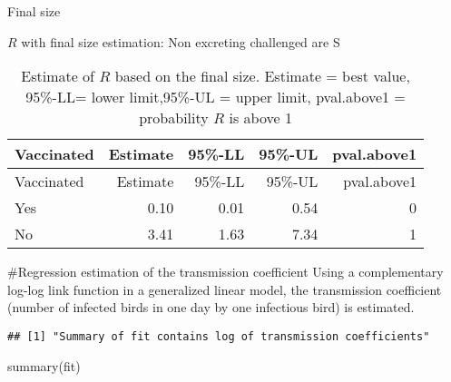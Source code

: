 \documentclass[
  ignorenonframetext,
]{beamer}
\newenvironment{Shaded}{\begin{snugshade}}{\end{snugshade}}
\newcommand{\AttributeTok}[1]{\textcolor[rgb]{0.77,0.63,0.00}{#1}}
\newcommand{\DecValTok}[1]{\textcolor[rgb]{0.00,0.00,0.81}{#1}}
\newcommand{\FunctionTok}[1]{\textcolor[rgb]{0.00,0.00,0.00}{#1}}
\newcommand{\NormalTok}[1]{#1}
\newcommand{\OtherTok}[1]{\textcolor[rgb]{0.56,0.35,0.01}{#1}}
\newcommand{\SpecialCharTok}[1]{\textcolor[rgb]{0.00,0.00,0.00}{#1}}
\newcommand{\StringTok}[1]{\textcolor[rgb]{0.31,0.60,0.02}{#1}}
\begin{document}
\begin{frame}[fragile]{Final size}
\begin{block}{\(R\) with final size estimation: Non excreting challenged
are S}
\protect\hypertarget{r-with-final-size-estimation-non-excreting-challenged-are-s}{}
\begin{longtable}[]{@{}lrrrr@{}}
\caption{Estimate of \(R\) based on the final size. Estimate = best
value, 95\%-LL= lower limit,95\%-UL = upper limit, pval.above1 =
probability \(R\) is above 1}\tabularnewline
\toprule
Vaccinated & Estimate & 95\%-LL & 95\%-UL & pval.above1 \\
\midrule
\endfirsthead
\toprule
Vaccinated & Estimate & 95\%-LL & 95\%-UL & pval.above1 \\
\midrule
\endhead
Yes & 0.10 & 0.01 & 0.54 & 0 \\
No & 3.41 & 1.63 & 7.34 & 1 \\
\bottomrule
\end{longtable}

\#Regression estimation of the transmission coefficient Using a
complementary log-log link function in a generalized linear model, the
transmission coefficient (number of infected birds in one day by one
infectious bird) is estimated.

\begin{Shaded}
\end{Shaded}

\begin{verbatim}
## [1] "Summary of fit contains log of transmission coefficients"
\end{verbatim}

\begin{Shaded}
\begin{Highlighting}[]
\FunctionTok{summary}\NormalTok{(fit)}
\end{Highlighting}
\end{Shaded}


\end{block}
\end{frame}
\end{document}
